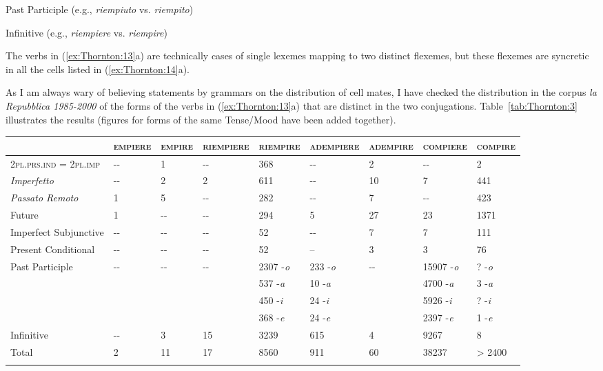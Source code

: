 \documentclass[output=paper]{langsci/langscibook}
\begin{document}
Past Participle (e.g., \emph{riempiuto} vs. \emph{riempito})

Infinitive (e.g., \emph{riempiere} vs. \emph{riempire})

\z
\z

The verbs in (\ref{ex:Thornton:13}a) are technically cases of single lexemes mapping to
two distinct flexemes, but these flexemes are syncretic in all the cells
listed in (\ref{ex:Thornton:14}a).

As I am always wary of believing statements by grammars on the
distribution of cell mates, I have checked the distribution in the
corpus \emph{la Repubblica 1985-2000} of the forms of the verbs in (\ref{ex:Thornton:13}a)
that are distinct in the two conjugations. Table~\ref{tab:Thornton:3} illustrates the
results (figures for forms of the same Tense\slash{}Mood have been added
together).

\begin{sidewaystable}
\begin{tabular}{lllllllll}
\lsptoprule
& \textsc{empiere} & \textsc{empire} & \textsc{riempiere} &
\textsc{riempire} & \textsc{adempiere} & \textsc{adempire} &
\textsc{compiere} & \textsc{compire}\\
\midrule
\textsc{2pl.prs.ind} = \textsc{2pl.imp} & -\/- & 1 & -\/- & 368 & -\/- &
2 & -\/- & 2\\
\emph{Imperfetto} & -\/- & 2 & 2 & 611 & -\/- & 10 & 7 &
441\\
\emph{Passato Remoto} & 1 & 5 & -\/- & 282 & -\/- & 7 & -\/- &
423\\
Future & 1 & -\/- & -\/- & 294 & 5 & 27 & 23 & 1371\\
Imperfect Subjunctive & -\/- & -\/- & -\/- & 52 & -\/- & 7 & 7 &
111\\
Present Conditional & -\/- & -\/- & -\/- & 52 & -- & 3 & 3 &
76\\
Past Participle & -\/- & -\/- & -\/- & 2307 -\emph{o}& 233 -\emph{o} & -\/- & 15907 -\emph{o} & ? -\emph{o}\\

 &  &  & &
537 -\emph{a} &
10 -\emph{a} &  &
4700 -\emph{a} &
3 -\emph{a}\\

& &  &  &
450 -\emph{i} &
24 -\emph{i} &&
5926 -\emph{i} &

? -\emph{i}\\

 &  & &  &
368 -\emph{e} &
24 -\emph{e} &&
2397 -\emph{e} &

1 -\emph{e}\\

Infinitive & -\/- & 3 & 15 & 3239 & 615 & 4 & 9267 & 8\\
Total & 2 & 11 & 17 & 8560 & 911 & 60 & 38237 & \textgreater{}
2400\\
\lspbottomrule
\end{tabular}
\caption{Frequency in \emph{la Repubblica 1985-2000} corpus of forms of the verbs in (\ref{ex:Thornton:13a}) in cells that have distinct realizations for the two conjugations.}
\label{tab:Thornton:3}
\end{sidewaystable}
\end{document}
